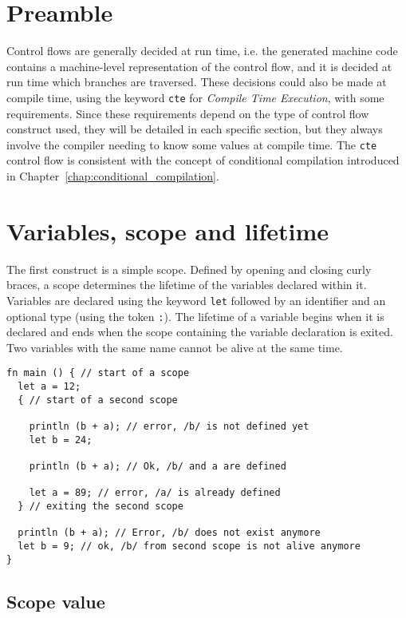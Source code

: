 \section{Preamble}

Control flows are generally decided at run time, i.e. the generated machine code
contains a machine-level representation of the control flow, and it is decided
at run time which branches are traversed. These decisions could also be made at
compile time, using the keyword \texttt{cte} for \textit{Compile Time
  Execution}, with some requirements. Since these requirements depend on the
type of control flow construct used, they will be detailed in each specific
section, but they always involve the compiler needing to know some values at
compile time. The \texttt{cte} control flow is consistent with the concept of
conditional compilation introduced in
Chapter~\ref{chap:conditional_compilation}.

\section{Variables, scope and lifetime}
\label{sec:variable_lifetime}

The first construct is a simple scope. Defined by opening and closing curly
braces, a scope determines the lifetime of the variables declared within it.
Variables are declared using the keyword \texttt{let} followed by an identifier
and an optional type (using the token \texttt{:}). The lifetime of a variable
begins when it is declared and ends when the scope containing the variable
declaration is exited. Two variables with the same name cannot be alive at the
same time.

\begin{lstlisting}[style=coloredverbatim]
fn main () { // start of a scope
  let a = 12;
  { // start of a second scope

    println (b + a); // error, /b/ is not defined yet
    let b = 24;

    println (b + a); // Ok, /b/ and a are defined

    let a = 89; // error, /a/ is already defined
  } // exiting the second scope

  println (b + a); // Error, /b/ does not exist anymore
  let b = 9; // ok, /b/ from second scope is not alive anymore
}
\end{lstlisting}

\subsection{Scope value}


